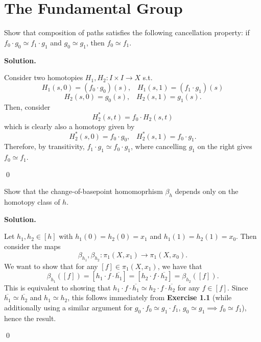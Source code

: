 \documentclass[12pt]{book}
\newcommand{\heq}{\simeq}
\theoremstyle{definition}
\newenvironment{solution}
{%
  \par\noindent\textbf{Solution.}\quad
}
{%
  \qed\par
}
{
  \vspace{2pt}
}
\begin{document}
\begin{taggedexercise}[\textcolor{red}{TODO}]
  
\end{taggedexercise}

\chapter{The Fundamental Group}

\begin{taggedexercise}[\textcolor{green}{Complete}]
  Show that composition of paths satisfies the following cancellation property:
  if $f_0 \cdot g_0 \heq f_1 \cdot g_1$ and $g_0 \heq g_1$, then $f_0 \heq f_1$.
\end{taggedexercise}
\begin{solution}
  Consider two homotopies $H_1, H_2 : I \times I \to X$ s.t. 
  \[H_1(s, 0) = (f_0 \cdot g_0)(s), \;\;\; H_1(s, 1) = (f_1 \cdot g_1)(s)\]
  \[H_2(s, 0) = g_0(s), \;\;\; H_2(s, 1) = g_1(s).\]
  Then, consider 
  \[H^{*}_2(s,t) = f_0 \cdot H_2(s,t)\]
  which is clearly also a homotopy given by
  \[H^*_2(s, 0 ) = f_0 \cdot g_0, \;\;\; H^*_2(s, 1) = f_0 \cdot g_1.\]
  Therefore, by transitivity, $f_1 \cdot g_1 \heq f_0 \cdot g_1$, where cancelling $g_1$ on the right gives $f_0 \heq f_1$.

\end{solution}

\begin{taggedexercise}[\textcolor{green}{Complete}]
  Show that the change-of-basepoint homomoprhism $\beta_h$ depends only on the homotopy class of $h$.
\end{taggedexercise}
\begin{solution}

  Let $h_1, h_2 \in [h]$ with $h_1(0) = h_2(0)=x_1$ and $h_1(1) = h_2(1) = x_0$.
  Then consider the maps
  \[\beta_{h_1}, \beta_{h_2} : \pi_1(X, x_1) \to \pi_1(X, x_0).\]
  We want to show that for any $[f] \in \pi_1(X, x_1)$, we have that
  \[\beta_{h_1}([f]) = [h_1 \cdot f \cdot \overline{h_1}] = [h_2 \cdot f \cdot \overline{h_2}] = \beta_{h_2}([f]).\]
  This is equivalent to showing that $h_1 \cdot f \cdot \overline{h_1} \heq h_2 \cdot f \cdot \overline{h_2}$ for any $f \in [f]$.
  Since $\overline{h_1} \heq \overline{h_2}$ and $h_1 \heq h_2$, this follows immediately from \textbf{Exercise 1.1}
  (while additionally using a similar argument for $g_0 \cdot f_0 \heq g_1 \cdot f_1$, $g_0 \heq g_1 \implies f_0 \heq f_1$), 
  hence the result.

\end{solution}
\end{document}
